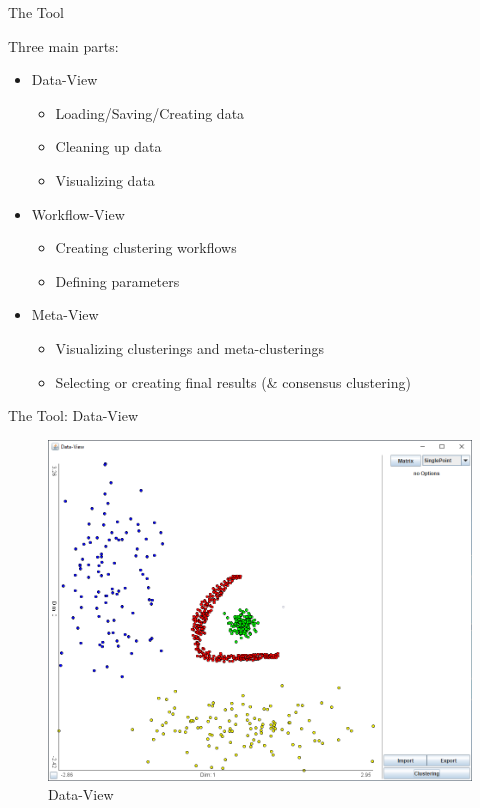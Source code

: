 \documentclass[aspectratio=169]{beamer}
\begin{document}
\begin{frame}{The Tool}
	
	Three main parts:
	\begin{itemize}
		\item Data-View
		\begin{itemize}
			\item Loading/Saving/Creating data
			\item Cleaning up data
			\item Visualizing data
		\end{itemize}
		\item Workflow-View
		\begin{itemize}
			\item Creating clustering workflows
			\item Defining parameters
		\end{itemize}
		\item Meta-View
		\begin{itemize}
			\item Visualizing clusterings and meta-clusterings
			\item Selecting or creating final results (\& consensus clustering)
		\end{itemize}
	\end{itemize}

\end{frame}

\begin{frame}{The Tool: Data-View}
	
	\begin{figure}
	  \centering
	    \includegraphics[width=.64\textwidth]{unob}
	  \caption{Data-View}
	  \label{fig:data-view}
	\end{figure}

\end{frame}
\end{document}
